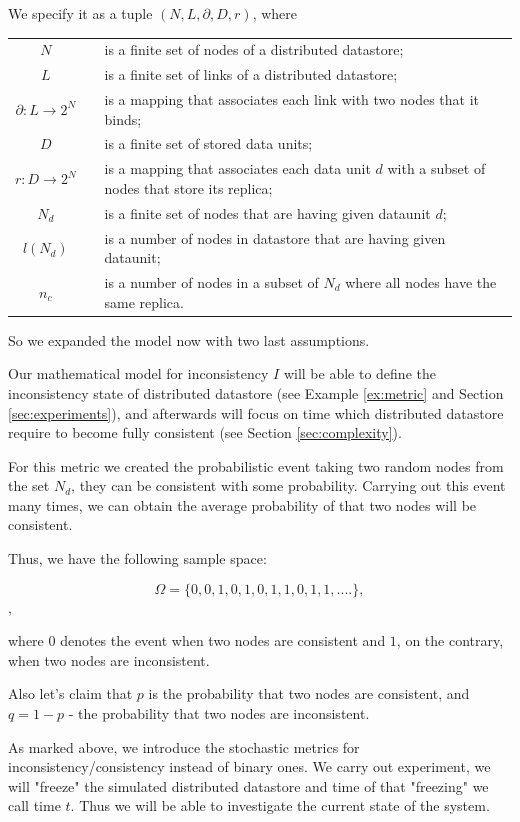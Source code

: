 \documentclass{llncs}
\begin{document}
We specify it as a tuple $(N, L, \partial,D, r)$, where \\
\begin{tabular*}{\textwidth}{cp{0.5cm}p{}}
$N$&& is a finite set of nodes of a distributed datastore; \\
$L$&& is a finite set of links of a distributed datastore; \\
$\partial:L\rightarrow 2^N$&& is a mapping that associates each link with two nodes that it binds;\\
$D$&& is a finite set of stored data units;\\
$r:D\rightarrow 2^N$&& is a mapping that associates each data unit $d$ with a subset of nodes 
that store its replica; \\


$N_d$&& is a finite set of nodes that are having given dataunit $d$; \\
$l(N_d)$&& is a number of nodes in datastore that are having given dataunit; \\
$n_c$&& is a number of nodes in a subset of $N_d$ where all nodes have the same replica.
\end{tabular*}

So we expanded the model now with two last assumptions.

Our mathematical model for inconsistency $I$ will be able to define the inconsistency state of distributed datastore (see Example \ref{ex:metric} and Section \ref{sec:experiments}), and afterwards will focus on time which distributed datastore require to become fully consistent (see Section \ref{sec:complexity}).

For this metric we created the probabilistic event taking two random nodes from the set $N_d$, they can be consistent with some probability. Carrying out this event many times, we can obtain the average probability of that two nodes will be consistent.


Thus, we have the following sample space:

\[\Omega = \{0, 0, 1, 0, 1, 0, 1 , 1, 0, 1, 1, ....\}, \],

where $0$ denotes the event when two nodes are consistent and $1$, on the contrary, when two nodes are inconsistent.

Also let's claim that $p$ is the probability that two nodes are consistent, and
$q = 1 -p$ - the probability that two nodes are inconsistent.


As marked above, we introduce the stochastic metrics for inconsistency/consistency instead of binary ones.
We carry out experiment, we will "freeze" the simulated distributed datastore and time of that "freezing" we call time $t$. Thus we will be able to investigate the current state of the system.
\end{document}
